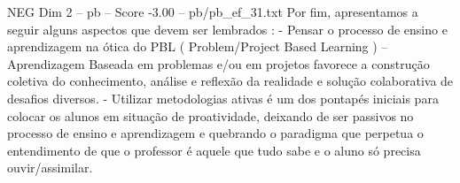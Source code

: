 \begin{textsample}{NEG Dim 2 – pb – Score -3.00 – pb/pb\_ef\_31.txt}
Por fim, apresentamos a seguir alguns aspectos que devem ser lembrados : - Pensar o processo de ensino e aprendizagem na ótica do PBL ( Problem/Project Based Learning ) – Aprendizagem Baseada em problemas e/ou em projetos favorece a construção coletiva do conhecimento, análise e reflexão da realidade e solução colaborativa de desafios diversos. - Utilizar metodologias ativas é um dos pontapés iniciais para colocar os alunos em situação de proatividade, deixando de ser passivos no processo de ensino e aprendizagem e quebrando o paradigma que perpetua o entendimento de que o professor é aquele que tudo sabe e o aluno só precisa ouvir/assimilar.

\end{textsample}
